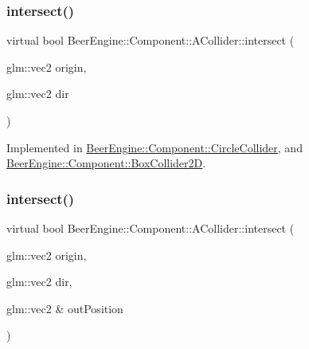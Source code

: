 \mbox{\label{class_beer_engine_1_1_component_1_1_a_collider_a84f924f6c0631f5f17b4e1852495a505}} 
\subsubsection{\texorpdfstring{intersect()}{intersect()}\hspace{0.1cm}{\footnotesize\ttfamily [1/2]}}
{\footnotesize\ttfamily virtual bool Beer\+Engine\+::\+Component\+::\+A\+Collider\+::intersect (\begin{DoxyParamCaption}\item[{glm\+::vec2}]{origin,  }\item[{glm\+::vec2}]{dir }\end{DoxyParamCaption})\hspace{0.3cm}{\ttfamily [pure virtual]}}



Implemented in \mbox{\hyperlink{class_beer_engine_1_1_component_1_1_circle_collider_a60737b2c9898672d28aa09b56c7fa07c}{Beer\+Engine\+::\+Component\+::\+Circle\+Collider}}, and \mbox{\hyperlink{class_beer_engine_1_1_component_1_1_box_collider2_d_a6ebe330aba3bb7f8f7a84686b0717e5d}{Beer\+Engine\+::\+Component\+::\+Box\+Collider2D}}.

\mbox{\label{class_beer_engine_1_1_component_1_1_a_collider_a2ffff777d86ac72aee0c0586ab651db8}} 
\subsubsection{\texorpdfstring{intersect()}{intersect()}\hspace{0.1cm}{\footnotesize\ttfamily [2/2]}}
{\footnotesize\ttfamily virtual bool Beer\+Engine\+::\+Component\+::\+A\+Collider\+::intersect (\begin{DoxyParamCaption}\item[{glm\+::vec2}]{origin,  }\item[{glm\+::vec2}]{dir,  }\item[{glm\+::vec2 \&}]{out\+Position }\end{DoxyParamCaption})\hspace{0.3cm}{\ttfamily [pure virtual]}}




